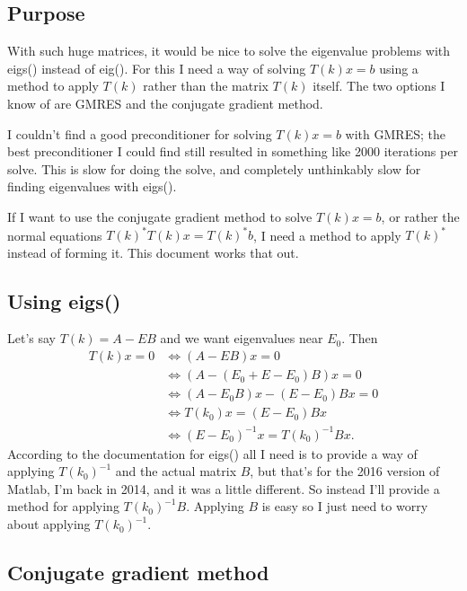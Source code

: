 \documentclass[letterpaper,12pt]{article}
\begin{document}
\subsection*{Purpose}

With such huge matrices, it would be nice to solve
the eigenvalue problems with eigs() instead of eig().
For this I need a way of solving $T(k)x = b$ using
a method to apply $T(k)$ rather than the matrix $T(k)$
itself. The two options I know of are GMRES and
the conjugate gradient method.

I couldn't find a good preconditioner for solving
$T(k)x = b$ with GMRES; the best preconditioner I could
find still resulted in something like 2000 iterations per solve.
This is slow for doing the solve, and completely unthinkably
slow for finding eigenvalues with eigs().

If I want to use the conjugate gradient method to solve
$T(k)x = b$, or rather the normal equations 
$T(k)^\ast T(k) x = T(k)^\ast b$, I need a method to 
apply $T(k)^\ast$ instead of forming it. This document
works that out.

\subsection*{Using eigs()}

Let's say $T(k) = A - E B$ and we want eigenvalues near $E_0$.
Then 
\begin{align*}
 T(k)x = 0 &\Leftrightarrow \left(A-EB\right)x = 0 \\ 
           &\Leftrightarrow \left(A - (E_0 + E-E_0)B\right)x = 0 \\           
           &\Leftrightarrow \left(A - E_0 B\right)x - (E-E_0)Bx = 0 \\ 
           &\Leftrightarrow T(k_0)x = (E-E_0)Bx \\ 
           &\Leftrightarrow (E-E_0)^{-1} x = T(k_0)^{-1}Bx.
\end{align*}
According to the documentation for eigs() all I need is to provide a way
of applying $T(k_0)^{-1}$ and the actual matrix $B$, but that's for the 2016
version of Matlab, I'm back in 2014, and it was a little different. So instead
I'll provide a method for applying $T(k_0)^{-1}B$. Applying $B$ is easy
so I just need to worry about applying $T(k_0)^{-1}$.

\subsection{Conjugate gradient method}
\end{document}
